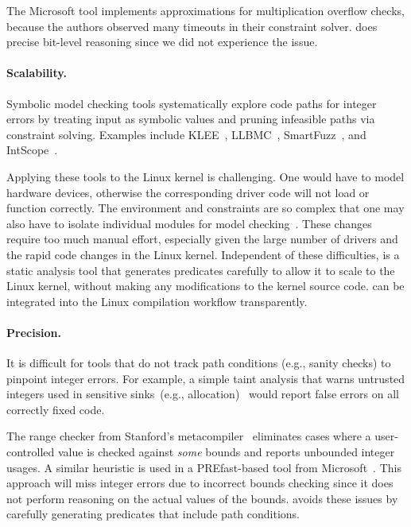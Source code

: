 The Microsoft tool implements approximations for multiplication
overflow checks, because the authors observed many timeouts in their
constraint solver.  \sys does precise bit-level reasoning
since we did not experience the issue.
\fi


\paragraph{Scalability.}
Symbolic model checking tools systematically explore code paths
for integer errors by treating input as symbolic values and pruning
infeasible paths via constraint solving.  Examples include
KLEE~\cite{cadar:klee},
LLBMC~\cite{llbmc},
SmartFuzz~\cite{molnar:catchconv},
and
IntScope~\cite{intscope}.

Applying these tools to the Linux kernel is challenging.  One would
have to model hardware devices, otherwise the corresponding driver
code will not load or function correctly.  The environment and
constraints are so complex that one may also have to isolate
individual modules for model checking~\cite{engler:vs}.  These
changes require too much manual effort, especially given the
large number of drivers and the rapid code changes in the Linux
kernel.
%
Independent of these difficulties, \sys is a static analysis tool that
generates predicates carefully to allow it to scale to the Linux kernel,
without making any modifications to the kernel source code. \sys can be
integrated into the Linux compilation workflow transparently.

\paragraph{Precision.}
It is difficult for tools that do not track path conditions (e.g.,
sanity checks) to pinpoint integer errors.  For example, a simple
taint analysis that warns untrusted integers used in sensitive
sinks~(e.g., allocation)~\cite{cqual, lclint} would report false
errors on all correctly fixed code.

The range checker from Stanford's metacompiler~\cite{range-checker}
eliminates cases where a user-controlled value is checked against
\emph{some} bounds and reports unbounded integer usages.  A similar heuristic
is used in a PREfast-based tool from Microsoft~\cite{prefast}.  This
approach will miss integer errors due to incorrect bounds checking since
it does not perform reasoning on the actual values of the bounds. \sys avoids
these issues by carefully generating predicates that include path conditions.


